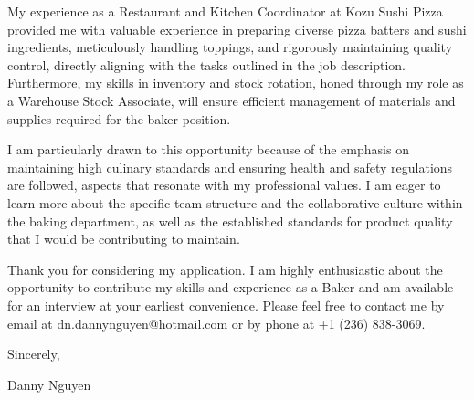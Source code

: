 \documentclass[letterpaper,11pt]{article}
\begin{document}
\vspace{10pt}
My experience as a Restaurant and Kitchen Coordinator at Kozu Sushi Pizza provided me with valuable experience in preparing diverse pizza batters and sushi ingredients, meticulously handling toppings, and rigorously maintaining quality control, directly aligning with the tasks outlined in the job description. Furthermore, my skills in inventory and stock rotation, honed through my role as a Warehouse Stock Associate, will ensure efficient management of materials and supplies required for the baker position.

\vspace{10pt}
I am particularly drawn to this opportunity because of the emphasis on maintaining high culinary standards and ensuring health and safety regulations are followed, aspects that resonate with my professional values. I am eager to learn more about the specific team structure and the collaborative culture within the baking department, as well as the established standards for product quality that I would be contributing to maintain.

\vspace{20pt}
Thank you for considering my application. I am highly enthusiastic about the opportunity to contribute my skills and experience as a Baker and am available for an interview at your earliest convenience. Please feel free to contact me by email at dn.dannynguyen@hotmail.com or by phone at +1 (236) 838-3069.

Sincerely,

\vspace{40pt} %
Danny Nguyen

\end{document}
